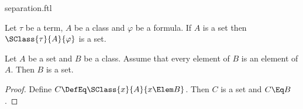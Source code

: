\documentclass{stex}
\begin{document}
\begin{smodule}{separation.ftl}


\begin{fakeforthel}
  \begin{axiom*}
    Let $\tau$ be a term, $A$ be a class and $\varphi$ be a formula.
    If $A$ is a set then $\SClass{\tau}{A}{\varphi}$ is a set.
  \end{axiom*}
\end{fakeforthel}

\begin{forthel}
  \begin{proposition*}
    Let $A$ be a set and $B$ be a class.
    Assume that every element of $B$ is an element of $A$.
    Then $B$ is a set.
  \end{proposition*}
  \begin{proof}
    Define $C \DefEq \SClass{x}{A}{x \Elem B}$.
    Then $C$ is a set and $C \Eq B$.
  \end{proof}
\end{forthel}

\end{smodule}
\end{document}
